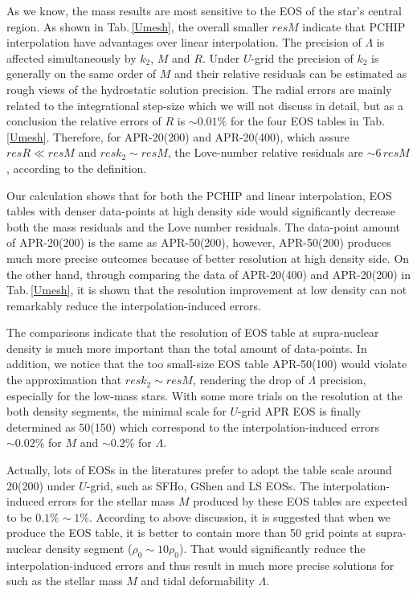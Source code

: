 \documentclass[preprint,tightenlines,eqsecnum,floats,aps,amsmath,amssymb,nofootinbib,prd,showpacs]{revtex4}
\begin{document}
As we know, the mass results are most sensitive to the EOS of the star's central region. As shown in Tab.$\,$\ref{Umesh}, the overall smaller $resM$ indicate that PCHIP interpolation have advantages over linear interpolation. The precision of $\Lambda$ is affected simultaneously by $k_2$, $M$ and $R$. Under $U$-grid the precision of $k_2$ is generally on the same order of $M$ and their relative residuals can be estimated as rough views of the hydrostatic solution precision. The radial errors are mainly related to the integrational step-size which we will not discuss in detail, but as a conclusion the relative errors of $R$ is $\sim 0.01\%$ for the four EOS tables in Tab.$\,$\ref{Umesh}. Therefore, for APR-20(200) and APR-20(400), which assure $resR \ll resM$ and $resk_2 \sim resM$, the Love-number relative residuals are $\sim 6 \, resM$, according to the definition.

Our calculation shows that for both the PCHIP and linear interpolation, EOS tables with denser data-points at high density side would significantly decrease both the mass residuals and the Love number residuals. The data-point amount of APR-20(200) is the same as APR-50(200), however, APR-50(200) produces much more precise outcomes because of better resolution at high density side. On the other hand, through comparing the data of APR-20(400) and APR-20(200) in Tab.$\,$\ref{Umesh}, it is shown that the resolution improvement at low density  can not remarkably reduce the interpolation-induced errors.

The comparisons indicate that the resolution of EOS table at supra-nuclear density is much more important than the total amount of data-points. In addition, we notice that the too small-size EOS table APR-50(100) would violate the approximation that $resk_2 \sim resM$, rendering the drop of $\Lambda$ precision, especially for the low-mass stars. With some more trials on the resolution at the both density segments, the minimal scale for $U$-grid APR EOS is finally determined as 50(150) which correspond to the interpolation-induced errors $\sim 0.02\%$ for $M$ and $\sim0.2\%$ for $\Lambda$.

Actually, lots of EOSs in the literatures prefer to adopt the table scale around 20(200) under $U$-grid, such as SFHo, GShen and LS EOSs. The interpolation-induced errors for the stellar mass $M$ produced by these EOS tables are expected to be $0.1\% \sim 1\%$. According to above discussion, it is suggested that when we produce the EOS table, it is better to contain more than 50 grid points at supra-nuclear density segment ($\rho_0 \sim 10\rho_0$). That would significantly reduce the interpolation-induced errors and thus result in much more precise solutions for such as the stellar mass $M$ and tidal deformability $\Lambda$.
\end{document}
